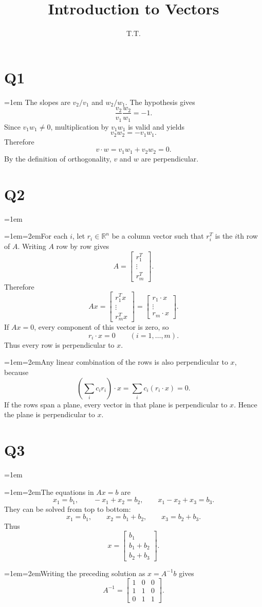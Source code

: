 \documentclass[11pt]{article}
\title{Introduction to Vectors}\author{T.T.}\date{}
\newcommand{\solutionquestion}[1]{\par\leftskip=0pt\section*{Q#1}\leftskip=1em}
\newcommand{\solutionpart}[1]{\par\smallskip\leftskip=1em\noindent\hangindent=2em\hangafter=1\makebox[1.5em][l]{\textbf{(#1)}}\hspace{0.5em}\ignorespaces}
\begin{document}
\maketitle
\solutionquestion{1}
The slopes are $v_2/v_1$ and $w_2/w_1$. The hypothesis gives
\[
\frac{v_2}{v_1}\frac{w_2}{w_1}=-1.
\]
Since $v_1w_1\ne0$, multiplication by $v_1w_1$ is valid and yields
\[
v_2w_2=-v_1w_1.
\]
Therefore
\[
v\cdot w=v_1w_1+v_2w_2=0.
\]
By the definition of orthogonality, $v$ and $w$ are perpendicular.

\solutionquestion{2}
\solutionpart{i}For each $i$, let $r_i\in\mathbb R^n$ be a column vector such that $r_i^{T}$ is the $i$th row of $A$. Writing $A$ row by row gives
\[
A=\begin{bmatrix}r_1^{T}\\\vdots\\r_m^{T}\end{bmatrix}.
\]
Therefore
\[
Ax=\begin{bmatrix}r_1^{T}x\\\vdots\\r_m^{T}x\end{bmatrix}
=\begin{bmatrix}r_1\cdot x\\\vdots\\r_m\cdot x\end{bmatrix}.
\]
If $Ax=0$, every component of this vector is zero, so
\[
r_i\cdot x=0\qquad(i=1,\ldots,m).
\]
Thus every row is perpendicular to $x$.

\solutionpart{ii}Any linear combination of the rows is also perpendicular to $x$, because
\[
\left(\sum_i c_i r_i\right)\cdot x=\sum_i c_i(r_i\cdot x)=0.
\]
If the rows span a plane, every vector in that plane is perpendicular to $x$. Hence the plane is perpendicular to $x$.

\solutionquestion{3}
\solutionpart{i}The equations in $Ax=b$ are
\[
x_1=b_1,\qquad -x_1+x_2=b_2,\qquad x_1-x_2+x_3=b_3.
\]
They can be solved from top to bottom:
\[
x_1=b_1,\qquad x_2=b_1+b_2,\qquad x_3=b_2+b_3.
\]
Thus
\[
x=\begin{bmatrix}b_1\\b_1+b_2\\b_2+b_3\end{bmatrix}.
\]

\solutionpart{ii}Writing the preceding solution as $x=A^{-1}b$ gives
\[
A^{-1}=
\begin{bmatrix}
1&0&0\\
1&1&0\\
0&1&1
\end{bmatrix}.
\]
\end{document}

